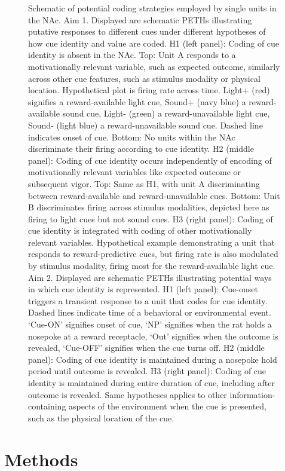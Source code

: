 \documentclass[11pt]{article}
\begin{document}
\begin{figure}[h]
\caption{Schematic of potential coding strategies employed by single units in the NAc. Aim 1. Displayed are schematic PETHs illustrating putative responses to different cues under different hypotheses of how cue identity and value are coded. H1 (left panel): Coding of cue identity is absent in the NAc. Top: Unit A responds to a motivationally relevant variable, such as expected outcome, similarly across other cue features, such as stimulus modality or physical location. Hypothetical plot is firing rate across time. Light+ (red) signifies a reward-available light cue, Sound+ (navy blue) a reward-available sound cue, Light- (green) a reward-unavailable light cue, Sound- (light blue) a reward-unavailable sound cue. Dashed line indicates onset of cue. Bottom: No units within the NAc discriminate their firing according to cue identity. H2 (middle panel): Coding of cue identity occurs independently of encoding of motivationally relevant variables like expected outcome or subsequent vigor. Top: Same as H1, with unit A discriminating between reward-available and reward-unavailable cues. Bottom: Unit B discriminates firing across stimulus modalities, depicted here as firing to light cues but not sound cues. H3 (right panel): Coding of cue identity is integrated with coding of other motivationally relevant variables. Hypothetical example demonstrating a unit that responds to reward-predictive cues, but firing rate is also modulated by stimulus modality, firing most for the reward-available light cue. Aim 2. Displayed are schematic PETHs illustrating potential ways in which cue identity is represented. H1 (left panel): Cue-onset triggers a transient response to a unit that codes for cue identity. Dashed lines indicate time of a behavioral or environmental event. ‘Cue-ON’ signifies onset of cue, ‘NP’ signifies when the rat holds a nosepoke at a reward receptacle, ‘Out’ signifies when the outcome is revealed, ‘Cue-OFF’ signifies when the cue turns off. H2 (middle panel): Coding of cue identity is maintained during a nosepoke hold period until outcome is revealed. H3 (right panel): Coding of cue identity is maintained during entire duration of cue, including after outcome is revealed. Same hypotheses applies to other information-containing aspects of the environment when the cue is presented, such as the physical location of the cue.}
\label{fig:schematic}
\end{figure}

\section*{Methods}
\end{document}
